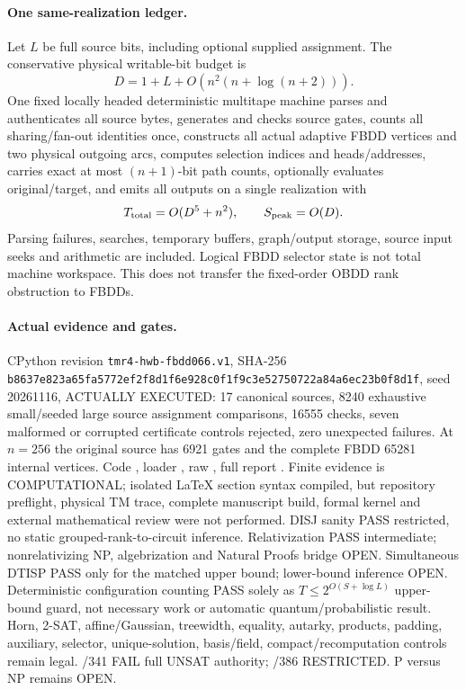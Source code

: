 \documentclass[11pt]{article}
\begin{document}
\paragraph{One same-realization ledger.}
Let $L$ be full source bits, including optional supplied assignment.
The conservative physical writable-bit budget is
\[
D=1+L+O(n^2(n+\log(n+2))).
\]
One fixed locally headed deterministic multitape machine parses and
authenticates all source bytes, generates and checks source gates,
counts all sharing/fan-out identities once, constructs all actual
adaptive FBDD vertices and two physical outgoing arcs, computes
selection indices and heads/addresses, carries exact at most
$(n+1)$-bit path counts, optionally evaluates original/target,
and emits all outputs on a single realization with
\[
T_{\rm total}=O(D^5+n^2),\qquad S_{\rm peak}=O(D).
\]
Parsing failures, searches, temporary buffers, graph/output storage,
source input seeks and arithmetic are included. Logical FBDD
selector state is not total machine workspace. This does not
transfer the fixed-order OBDD rank obstruction to FBDDs.

\paragraph{Actual evidence and gates.}
CPython revision \texttt{tmr4-hwb-fbdd066.v1},
SHA-256 \texttt{b8637e823a65fa5772ef2f8d1f6e928c0f1f9c3e52750722a84a6ec23b0f8d1f},
seed 20261116, ACTUALLY EXECUTED: 17 canonical sources, 8240
exhaustive small/seeded large source assignment comparisons,
16555 checks, seven malformed or corrupted certificate controls
rejected, zero unexpected failures. At $n=256$ the original
source has 6921 gates and the complete FBDD 65281 internal vertices.
Code ,
loader ,
raw ,
full report .
Finite evidence is COMPUTATIONAL; isolated LaTeX section syntax compiled,
but repository preflight, physical TM trace, complete manuscript build,
formal kernel and external mathematical review were not performed.
DISJ sanity PASS restricted, no static grouped-rank-to-circuit
inference. Relativization PASS intermediate; nonrelativizing NP,
algebrization and Natural Proofs bridge OPEN.
Simultaneous DTISP PASS only for the matched upper bound;
lower-bound inference OPEN. Deterministic configuration counting
PASS solely as $T\le2^{O(S+\log L)}$ upper-bound guard, not
necessary work or automatic quantum/probabilistic result.
Horn, 2-SAT, affine/Gaussian, treewidth, equality, autarky,
products, padding, auxiliary, selector, unique-solution,
basis/field, compact/recomputation controls remain legal.
/341 FAIL full UNSAT authority; /386 RESTRICTED.
P versus NP remains OPEN.
\end{document}
